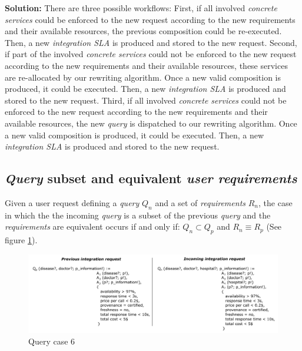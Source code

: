\bigskip
\noindent \textbf{Solution:} There are three possible workflows: First, if all involved \textsl{concrete services} could be enforced to the new request according to the new requirements and their available resources, the previous composition could be re-executed. Then, a new \textsl{integration SLA} is produced and stored to the new request. Second, if part of the involved \textsl{concrete services} could not be enforced to the new request according to the new requirements and their available resources, these services are re-allocated by our rewriting algorithm. Once a new valid composition is produced, it  could be executed. Then, a new \textsl{integration SLA} is produced and stored to the new request. Third, if all involved \textsl{concrete services} could not be enforced to the new request according to the new requirements and their available resources, the new \textsl{query} is dispatched to our rewriting algorithm. Once a new valid composition is produced, it  could be executed. Then, a new \textsl{integration SLA} is produced and stored to the new request.

\subsection{\textsl{Query} subset and equivalent \textsl{user requirements}}
Given a user request defining a \textsl{query} $Q_{n}$ and a set of \textsl{requirements} $R_{n}$, the case in which the the incoming \textsl{query} is a subset of the previous \textsl{query} and the \textsl{requirements} are equivalent occurs if and only if: $Q_{n} \subset Q_{p}$ and $R_{n} \equiv R_{p}$ (See figure \ref{fig:case6}). 

\begin{figure}[h!]
\center
\includegraphics[scale=0.85]{figures/query-case-6.pdf}\caption{Query case 6} \label{fig:case6}
\end{figure}

